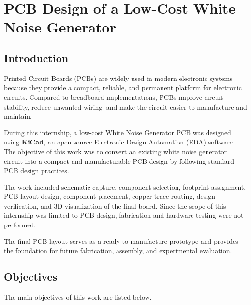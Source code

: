 \chapter{PCB Design of a Low-Cost White Noise Generator}

\section{Introduction}

Printed Circuit Boards (PCBs) are widely used in modern electronic systems because they provide a compact, reliable, and permanent platform for electronic circuits. Compared to breadboard implementations, PCBs improve circuit stability, reduce unwanted wiring, and make the circuit easier to manufacture and maintain.

During this internship, a low-cost White Noise Generator PCB was designed using \textbf{KiCad}, an open-source Electronic Design Automation (EDA) software. The objective of this work was to convert an existing white noise generator circuit into a compact and manufacturable PCB design by following standard PCB design practices.

The work included schematic capture, component selection, footprint assignment, PCB layout design, component placement, copper trace routing, design verification, and 3D visualization of the final board. Since the scope of this internship was limited to PCB design, fabrication and hardware testing were not performed.

The final PCB layout serves as a ready-to-manufacture prototype and provides the foundation for future fabrication, assembly, and experimental evaluation.


\section{Objectives}

The main objectives of this work are listed below.

